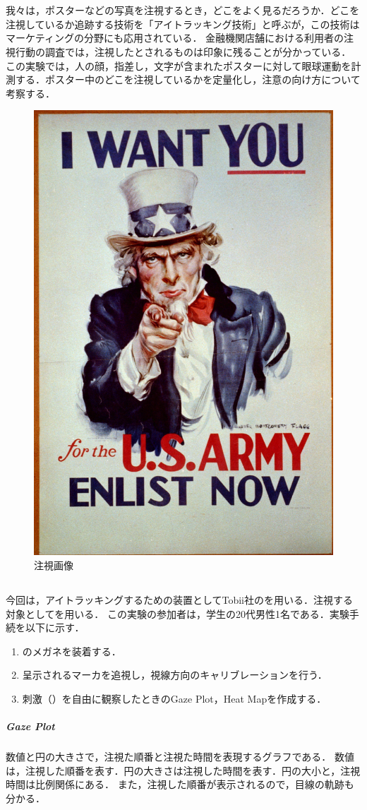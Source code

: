 \chapter{\kadaid}
\section{\purpose}
我々は，ポスターなどの写真を注視するとき，どこをよく見るだろうか．どこを注視しているか追跡する技術を「アイトラッキング技術」と呼ぶが，この技術はマーケティングの分野にも応用されている．
金融機関店舗における利用者の注視行動の調査\cite{アイトラッキング技術を用いた地域実践的研究の報告}では，注視したとされるものは印象に残ることが分かっている．
この実験では，人の顔，指差し，文字が含まれたポスターに対して眼球運動を計測する．ポスター中のどこを注視しているかを定量化し，注意の向け方について考察する．

\begin{figure}
    \centering
    \includegraphics[keepaspectratio,width=.2\textwidth]{../../12_DataAnalysis/snapshot.jpg}
    \caption{注視画像}
    \label{fig:注視画像}
    \vspace{-1cm}
\end{figure}
\section{\method}
今回は，アイトラッキングするための装置としてTobii社の\tobi を用いる．注視する対象としてを用いる．
この実験の参加者は，学生の20代男性1名である．実験手続を以下に示す．
\begin{enumerate}
    \renewcommand{\labelenumi}{\fbox{\theenumi}}
    \item \tobi のメガネを装着する．
    \item 呈示されるマーカを追視し，視線方向のキャリブレーションを行う．
    \item 刺激（）を自由に観察したときのGaze Plot，Heat Mapを作成する．
\end{enumerate}
\paragraph{Gaze Plot}
数値と円の大きさで，注視た順番と注視た時間を表現するグラフである．
数値は，注視した順番を表す．円の大きさは注視した時間を表す．円の大小と，注視時間は比例関係にある．
また，注視した順番が表示されるので，目線の軌跡も分かる．
